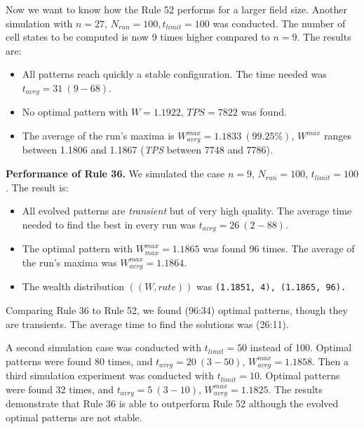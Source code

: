 \documentclass[10pt,a4paper]{article}  %
\begin{document}
Now we want to know how the Rule 52 performs for a larger field size. 
Another simulation with $n=27$, $N_{run}=100, t_{limit}=100$ was conducted.
The number of cell states to be computed is now 9 times higher
compared to $n=9$. The results are:

\begin{itemize}
  \item
  All patterns reach quickly a stable configuration.
  The  time needed was $t_{avrg}= 31 ~(9-68)$.  

	\item 
  No optimal pattern with $W=1.1922$, $\textit{TPS}=7822$ was found. 
  
  \item
   The average of the run's maxima is $W^{max}_{avrg}=1.1833 ~(99.25\%)$,
  $W^{max}$ ranges between 1.1806 and 1.1867 (\textit{TPS} between 7748 and 7786).   
  
\end{itemize}



    
\textbf{Performance of  Rule 36.}   
We simulated the case $n=9$, $N_{run}=100$, $t_{limit}=100$.
The result is:

\begin{itemize}
	\item 
  All evolved patterns are \textit{transient} but of very high quality.
  The average time needed to find the best in every run was $t_{avrg}= 26 ~(2-88)$.
  \item
  The optimal pattern with $W^{max}_{max}=1.1865$ was found 96 times. 
  The average of the run's maxima was $W^{max}_{avrg}=1.1864$. 
  \item
  The wealth distribution $((W, rate))$ was   
  \footnotesize
  \texttt{(1.1851, 4),  (1.1865, 96).}
  \normalsize 

\end{itemize}

Comparing Rule 36 to Rule 52, we found (96:34) optimal patterns, though they are transients. 
The average time to find the solutions was (26:11).

A second simulation case  was conducted with $t_{limit}=50$ instead of 100.
Optimal patterns were found 80 times, and 
$t_{avrg}= 20 ~(3-50)$, $W^{max}_{avrg}=1.1858$.
Then a third  simulation experiment  was conducted with $t_{limit}=10$.
Optimal patterns were found 32 times, and 
$t_{avrg}= 5 ~(3-10)$, $W^{max}_{avrg}=1.1825$.
The results demonstrate that Rule 36 is able to outperform Rule 52 although the 
evolved optimal patterns are not stable.   
\end{document}
